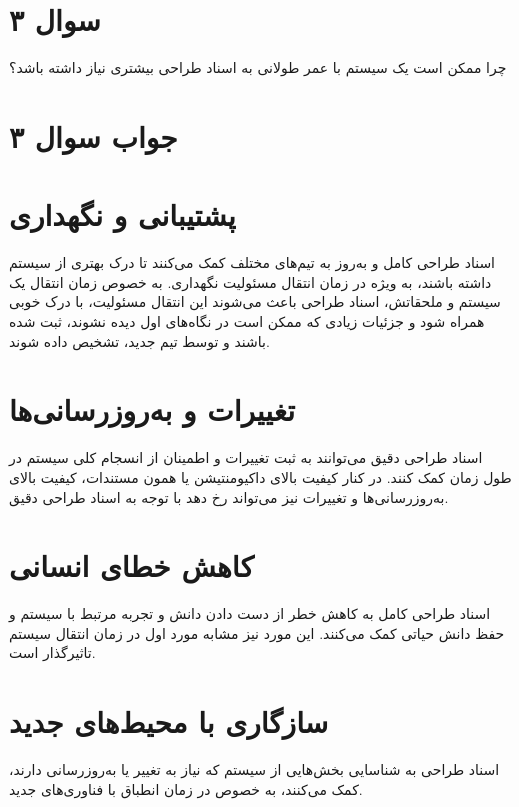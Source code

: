 \section*{سوال ۳}

چرا ممکن است یک سیستم با عمر طولانی به اسناد طراحی بیشتری نیاز داشته باشد؟

\section*{جواب سوال ۳}

\section*{پشتیبانی و نگهداری}
اسناد طراحی کامل و به‌روز به تیم‌های مختلف کمک می‌کنند تا درک بهتری از سیستم داشته باشند، به ویژه در زمان انتقال مسئولیت نگهداری. به خصوص زمان انتقال یک سیستم و ملحقاتش، اسناد طراحی باعث می‌شوند این انتقال مسئولیت، با درک خوبی همراه شود و جزئیات زیادی که ممکن است در نگاه‌های اول دیده نشوند، ثبت شده باشند و توسط تیم جدید، تشخیص داده شوند.

\section*{تغییرات و به‌روزرسانی‌ها}
اسناد طراحی دقیق می‌توانند به ثبت تغییرات و اطمینان از انسجام کلی سیستم در طول زمان کمک کنند. در کنار کیفیت بالای داکیومنتیشن یا همون مستندات، کیفیت بالای به‌روزرسانی‌ها و تغییرات نیز می‌تواند رخ دهد با توجه به اسناد طراحی دقیق.

\section*{کاهش خطای انسانی}
اسناد طراحی کامل به کاهش خطر از دست دادن دانش و تجربه مرتبط با سیستم و حفظ دانش حیاتی کمک می‌کنند. این مورد نیز مشابه مورد اول در زمان انتقال سیستم تاثیرگذار است.

\section*{سازگاری با محیط‌های جدید}
اسناد طراحی به شناسایی بخش‌هایی از سیستم که نیاز به تغییر یا به‌روزرسانی دارند، کمک می‌کنند، به خصوص در زمان انطباق با فناوری‌های جدید.